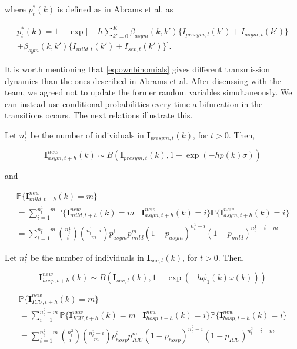 \documentclass[a4paper]{article}
\renewcommand{\vec}[1]{\boldsymbol{#1}}
\theoremstyle{remark}
\begin{document}
where $p_t^*(k)$ is defined as in Abrams et al. as

\begin{equation}
\begin{split}
\label{eq:rate_poisson}
    p_t^*(k)=1-\exp\Bigg[-h\sum_{k'=0}^{K}\beta_{asym}(k,k') \{I_{presym,t}(k')+I_{asym,t}(k')\}\\+\beta_{sym}(k,k') \{I_{mild,t}(k')+I_{sev,t}(k')\}\Bigg].
\end{split}
\end{equation}

It is worth mentioning that \eqref{eq:ownbinomials} gives different transmission dynamics than the ones described in Abrams et al. {\color{red} After discussing with the team, we agreed not to update the former random variables simultaneously. We can instead use conditional probabilities every time a bifurcation in the transitions occurs. The next relations illustrate this.}

\medskip
Let $n_t^1$ be the number of individuals in $\vec{I}_{presym,t}(k)$, for $t>0$. Then, 

\[\vec{I}_{asym,t+h}^{new}(k) \sim B(\vec{I}_{presym,t}(k),1-\exp(-hp(k)\sigma))\]

and

\begin{equation}
\begin{split}
\mathbb{P}\{\vec{I}_{mild,t+h}^{new}(k)=m\}\\
= \sum_{i=1}^{n_t^1-m}\mathbb{P}\{\vec{I}_{mild,t+h}^{new}(k)=m \mid \vec{I}_{asym,t+h}^{new}(k)=i\}\mathbb{P}\{\vec{I}_{asym,t+h}^{new}(k)=i\}\\
= \sum_{i=1}^{n_t^1-m}{n_t^1 \choose i}{n_t^1-i \choose m}p_{asym}^{i}p_{mild}^{m}(1-p_{asym})^{n_t^1-i}(1-p_{mild})^{n_t^1-i-m}
\end{split}
\end{equation}

Let $n_t^2$ be the number of individuals in $\vec{I}_{sev,t}(k)$, for $t>0$. Then, 

\[\vec{I}_{hosp,t+h}^{new}(k)\sim B(\vec{I}_{sev,t}(k),1-\exp(-h\phi_1(k)\omega(k)))\]



\begin{equation}
\begin{split}
\mathbb{P}\{\vec{I}_{ICU,t+h}^{new}(k)=m\}\\
= \sum_{i=1}^{n_t^2-m}\mathbb{P}\{\vec{I}_{ICU,t+h}^{new}(k)=m \mid \vec{I}_{hosp,t+h}^{new}(k)=i\}\mathbb{P}\{\vec{I}_{hosp,t+h}^{new}(k)=i\}\\
= \sum_{i=1}^{n_t^2-m}{n_t^2 \choose i}{n_t^2-i \choose m}p_{hosp}^{i}p_{ICU}^{m}(1-p_{hosp})^{n_t^2-i}(1-p_{ICU})^{n_t^2-i-m}
\end{split}
\end{equation}
\end{document}
